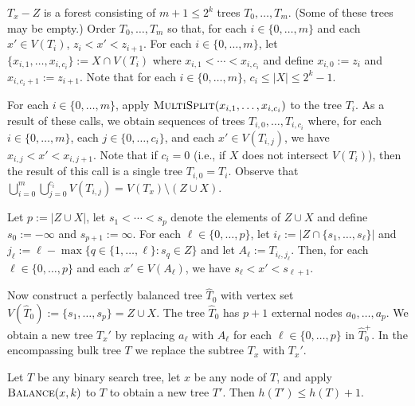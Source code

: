 \documentclass[10pt, conference, compsocconf]{IEEEtran}
\let\le\leqslant
\begin{document}
$T_x-Z$ is a forest consisting of $m+1\le 2^{k}$ trees $T_0,\dots,T_m$. (Some of these trees may be empty.)  Order $T_{0},\dots,T_m$ so that, for each $i\in\{0,\dots,m\}$ and each $x'\in V(T_i)$, $z_i< x' < z_{i+1}$.  For each $i\in\{0,\dots,m\}$, let $\{x_{i,1},\dots,x_{i,c_i}\}:=X\cap V(T_i)$ where $x_{i,1}<\cdots<x_{i,c_i}$ and define $x_{i,0}:=z_i$ and $x_{i,c_i+1}:=z_{i+1}$. Note that for each $i\in\{0,\dots,m\}$, $c_i\le |X|\le 2^k-1$.

For each $i\in\{0,\dots,m\}$, apply $\textsc{MultiSplit}(x_{i,1},\dots,x_{i,c_i})$ to the tree $T_i$.  As a result of these calls, we obtain sequences of trees $T_{i,0},\dots,T_{i,c_i}$ where, for each $i\in\{0,\dots,m\}$, each $j\in\{0,\dots,c_i\}$, and each $x'\in V(T_{i,j})$, we have $x_{i,j}<x'<x_{i,j+1}$.  Note that if $c_i=0$ (i.e., if $X$ does not intersect $V(T_i)$), then the result of this call is a single tree $T_{i,0}=T_i$.
Observe that $\bigcup_{i=0}^m\bigcup_{j=0}^{c_i} V(T_{i,j}) = V(T_x)\setminus (Z\cup X)$.

Let $p := |Z\cup X|$, let $s_1<\cdots< s_p$ denote the elements of $Z\cup X$ and define $s_0 := -\infty$ and $s_{p+1} := \infty$.  For each $\ell\in\{0,\dots,p\}$, let $i_\ell:=|Z\cap \{s_1,\dots,s_\ell\}|$ and $j_\ell:= \ell - \max\{ q\in\{1,\dots,\ell\}: s_q\in Z\}$ and let $A_\ell:=T_{i_\ell,j_\ell}$.   Then, for each $\ell\in \{0,\dots,p\}$ and each $x'\in V(A_\ell)$, we have $s_\ell < x' < s_{\ell+1}$.

Now construct a perfectly balanced tree $\hat{T}_0$ with vertex set $V(\hat{T}_0):=\{s_1,\dots,s_p\}=Z\cup X$.  The tree $\hat{T}_0$ has $p+1$ external nodes $a_0,\dots,a_p$.  We obtain a new tree $T_x'$ by replacing $a_\ell$ with $A_\ell$ for each $\ell\in\{0,\dots,p\}$ in $\hat{T}_0^+$.  In the encompassing bulk tree $T$ we replace the subtree $T_x$ with $T_x'$.

\begin{lem}
  Let $T$ be any binary search tree, let $x$ be any node of $T$, and apply $\textsc{Balance}(x,k)$ to $T$ to obtain a new tree $T'$.  Then $h(T')\le h(T)+1$.
\end{lem}

\end{document}
